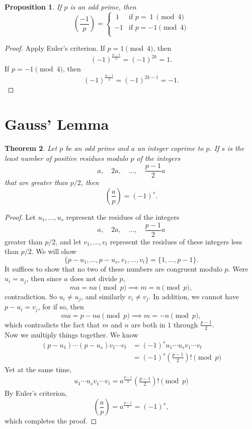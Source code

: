 \documentclass{amsbook}
\numberwithin{section}{chapter}
\theoremstyle{plain}
\newtheorem{thm}{Theorem}[section]
\newtheorem{prop}[thm]{Proposition}
\theoremstyle{definition}
\def\br{~\\[1em]}
\begin{document}
\begin{prop}
If $p$ is an odd prime, then
\[\left(\frac{-1}{p}\right) =\begin{cases}
~1&\text{if $p =~1~\pmod 4$}\\
-1&\text{if $p = -1\pmod 4$}\\
\end{cases}\] 
\end{prop}
\begin{proof}
Apply Euler's criterion. If $p = 1\pmod 4$, then
\[(-1)^\frac{p- 1}{2} = (-1)^{2k} = 1.\]
If $p = -1\pmod 4$, then
\[(-1)^\frac{p- 1}{2} = (-1)^{2k-1} = -1.\]
\end{proof}
\section{Gauss' Lemma}
\begin{thm}
Let $p$ be an odd prime and $a$ an integer coprime to $p$.
If $s$ is the least number of positive residues modulo $p$
of the integers
\[a,\quad 2a,\quad\dots,\quad\frac{p-1}{2}a\]
that are greater than $p/2$, then
\[\left(\frac{a}{p}\right) = (-1)^s.\]
\end{thm}
\begin{proof}
Let $u_1,\dots,u_s$ represent the residues of the integers
\[a,\quad 2a,\quad\dots,\quad\frac{p-1}{2}a\]
greater than $p/2$, and let $v_1,\dots,v_t$ represent
the residues of these integers less than $p/2$. We will show
\[\{p-u_1,\dots, p-u_s, v_1,\dots,v_t\} = \{1,\dots, p-1\}.\]
It suffices to show that no two of these numbers
are congruent modulo $p$. Were $u_i = u_j$,
then since $a$ does not divide $p$,
\[ma = na\pmod p\implies m = n\pmod p,\]
contradiction. So $u_i\ne u_j$, and similarly $v_i\ne v_j$.
In addition, we cannot have $p - u_i = v_j$, for if so, then
\[ma = p - na\pmod p\implies m= -n\pmod p,\]
which contradicts the fact that $m$ and $n$ are both
in $1$ through $\frac{p-1}{2}$.
\br
Now we multiply things together. We know
\begin{align*}
(p - u_1)\cdots(p - u_s)v_1\cdots v_t
&= (-1)^su_1\cdots u_sv_1\cdots v_t\\
&= (-1)^s\left(\frac{p-1}{2}\right)!\pmod p
\end{align*}
Yet at the same time,
\begin{align*}
u_1\cdots u_sv_1\cdots v_t = a^\frac{p-1}{2}\left(\frac{p-1}{2}\right)!\pmod p
\end{align*}
By Euler's criterion,
\[\left(\frac{a}{p}\right) = a^\frac{p-1}{2} = (-1)^s,\]
which completes the proof.
\end{proof}
\end{document}
